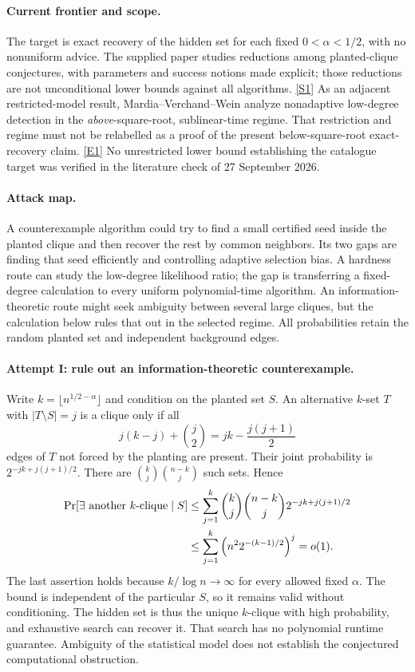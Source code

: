 \documentclass[11pt,a4paper]{article}
\newcommand{\sref}[2]{\hyperlink{source:#1:#2}{[S#2]}}
\newcommand{\eref}[2]{\hyperlink{extra:#1:#2}{[E#2]}}
\numberwithin{equation}{section}
\begin{document}
\paragraph{Current frontier and scope.}
The target is exact recovery of the hidden set for each fixed
$0<\alpha<1/2$, with no nonuniform advice.  The supplied paper studies
reductions among planted-clique conjectures, with parameters and success
notions made explicit; those reductions are not unconditional lower
bounds against all algorithms. \sref{statement}{1}
As an adjacent restricted-model result, Mardia--Verchand--Wein analyze
nonadaptive low-degree detection in the \emph{above}-square-root,
sublinear-time regime.  That restriction and regime must not be
relabelled as a proof of the present below-square-root exact-recovery
claim. \eref{statement}{1}  No unrestricted lower bound establishing the
catalogue target was verified in the literature check of
27 September 2026.

\paragraph{Attack map.}
A counterexample algorithm could try to find a small certified seed
inside the planted clique and then recover the rest by common neighbors.
Its two gaps are finding that seed efficiently and controlling adaptive
selection bias.  A hardness route can study the low-degree likelihood
ratio; the gap is transferring a fixed-degree calculation to every
uniform polynomial-time algorithm.  An information-theoretic route
might seek ambiguity between several large cliques, but the calculation
below rules that out in the selected regime.  All probabilities retain
the random planted set and independent background edges.

\paragraph{Attempt I: rule out an information-theoretic counterexample.}
Write $k=\lfloor n^{1/2-\alpha}\rfloor$ and condition on the planted
set $S$.  An alternative $k$-set $T$ with $|T\setminus S|=j$ is a
clique only if all
\[
 j(k-j)+\binom j2=jk-\frac{j(j+1)}2
\]
edges of $T$ not forced by the planting are present.  Their joint
probability is $2^{-jk+j(j+1)/2}$.  There are
$\binom kj\binom{n-k}j$ such sets.  Hence
\begin{align}\label{statement:unique}
 \Pr[\exists\text{ another $k$-clique}\mid S]
 &\leq\sum_{j=1}^{k}\binom kj\binom{n-k}j
                  2^{-jk+j(j+1)/2}\\
 &\leq\sum_{j=1}^{k}\left(n^2 2^{-(k-1)/2}\right)^j=o(1).\notag
\end{align}
The last assertion holds because $k/\log n\to\infty$ for every
allowed fixed $\alpha$.  The bound is independent of the particular
$S$, so it remains valid without conditioning.  The hidden set is thus
the unique $k$-clique with high probability, and exhaustive search can
recover it.  That search has no polynomial runtime guarantee.
Ambiguity of the statistical model does not establish the conjectured
computational obstruction.
\end{document}
